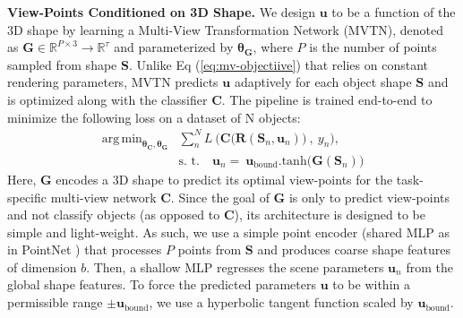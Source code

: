 \documentclass[10pt,twocolumn,letterpaper]{article}
\DeclareMathOperator*{\argmin}{arg\,min}
\newcommand{\eqLabel}[1]{{Eq (#1)}}
\newcommand{\mysection}[1]{\noindent\textbf{#1.}}
\begin{document}
\vspace{1pt}\mysection{View-Points Conditioned on 3D Shape}
We design $\mathbf{u}$ to be a function of the 3D shape by learning a Multi-View Transformation Network (MVTN), denoted as $\mathbf{G} \in \mathbb{R}^{P\times 3} \rightarrow{\mathbb{R}^{\tau}} $ and parameterized by $\boldsymbol{\theta}_{\mathbf{G}}$, where $P$ is the number of points sampled from shape $\mathbf{S}$. 
Unlike \eqLabel{\ref{eq:mv-objectiive}} that relies on constant rendering parameters, MVTN predicts $\mathbf{u}$ adaptively for each object shape $\mathbf{S}$ and is optimized along with the classifier $ \mathbf{C}$. The pipeline is trained end-to-end to minimize the following loss on a dataset of N objects:
\begin{equation}
\begin{aligned} 
 \argmin_{\boldsymbol{\theta}_{\mathbf{C}}, \boldsymbol{\theta}_{\mathbf{G}}} &\sum_{n}^{N} L~\Big( \mathbf{C} \big(\mathbf{R}(\mathbf{S}_n,\mathbf{u}_n)\big)~,~y_n \Big), \\& \text{s. t.} \quad \mathbf{u}_n = ~ \mathbf{u}_{\text{bound}}.\text{tanh}\big( \mathbf{G}(\mathbf{S}_n)\big)
\label{eq:mvt-objective}
\end{aligned} 
\end{equation}
Here, $\mathbf{G}$ encodes a 3D shape to predict its optimal view-points for the task-specific multi-view network $\mathbf{C}$. Since the goal of $\mathbf{G}$ is only to predict view-points and not classify objects (as opposed to $\mathbf{C}$), its architecture is designed to be simple and light-weight. 
As such, we use a simple point encoder (\eg shared MLP as in PointNet \cite{pointnet}) that processes $P$ points from $\mathbf{S}$ and produces coarse shape features of dimension $b$. Then, a shallow MLP regresses the scene parameters $\mathbf{u}_n$ from the global shape features.
To force the predicted parameters $\mathbf{u}$ to be within a permissible range $\pm\mathbf{u}_{\text{bound}}$, we use a hyperbolic tangent function scaled by $\mathbf{u}_{\text{bound}}$.
\end{document}
